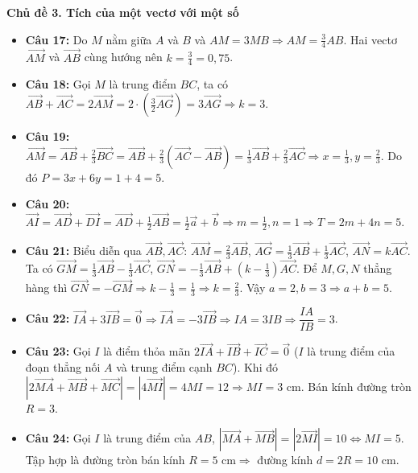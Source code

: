\documentclass[12pt,a4paper]{article}
\begin{document}
\noindent\textbf{\large Chủ đề 3. Tích của một vectơ với một số}
\begin{itemize}[leftmargin=1.5em, itemsep=2.5pt]
    \item \textbf{Câu 17:} Do $M$ nằm giữa $A$ và $B$ và $AM = 3MB \Rightarrow AM = \frac{3}{4}AB$. Hai vectơ $\vec{AM}$ và $\vec{AB}$ cùng hướng nên $k = \frac{3}{4} = 0{,}75$.
    \item \textbf{Câu 18:} Gọi $M$ là trung điểm $BC$, ta có $\vec{AB} + \vec{AC} = 2\vec{AM} = 2 \cdot \left(\frac{3}{2}\vec{AG}\right) = 3\vec{AG} \Rightarrow k = 3$.
    \item \textbf{Câu 19:} $\vec{AM} = \vec{AB} + \frac{2}{3}\vec{BC} = \vec{AB} + \frac{2}{3}(\vec{AC} - \vec{AB}) = \frac{1}{3}\vec{AB} + \frac{2}{3}\vec{AC} \Rightarrow x = \frac{1}{3}, y = \frac{2}{3}$. Do đó $P = 3x + 6y = 1 + 4 = 5$.
    \item \textbf{Câu 20:} $\vec{AI} = \vec{AD} + \vec{DI} = \vec{AD} + \frac{1}{2}\vec{AB} = \frac{1}{2}\vec{a} + \vec{b} \Rightarrow m = \frac{1}{2}, n = 1 \Rightarrow T = 2m + 4n = 5$.
    \item \textbf{Câu 21:} Biểu diễn qua $\vec{AB}, \vec{AC}$: $\vec{AM} = \frac{2}{3}\vec{AB}$, $\vec{AG} = \frac{1}{3}\vec{AB} + \frac{1}{3}\vec{AC}$, $\vec{AN} = k \vec{AC}$. Ta có $\vec{GM} = \frac{1}{3}\vec{AB} - \frac{1}{3}\vec{AC}$, $\vec{GN} = -\frac{1}{3}\vec{AB} + \left(k - \frac{1}{3}\right)\vec{AC}$. Để $M, G, N$ thẳng hàng thì $\vec{GN} = -\vec{GM} \Rightarrow k - \frac{1}{3} = \frac{1}{3} \Rightarrow k = \frac{2}{3}$. Vậy $a = 2, b = 3 \Rightarrow a + b = 5$.
    \item \textbf{Câu 22:} $\vec{IA} + 3\vec{IB} = \vec{0} \Rightarrow \vec{IA} = -3\vec{IB} \Rightarrow IA = 3IB \Rightarrow \dfrac{IA}{IB} = 3$.
    \item \textbf{Câu 23:} Gọi $I$ là điểm thỏa mãn $2\vec{IA} + \vec{IB} + \vec{IC} = \vec{0}$ ($I$ là trung điểm của đoạn thẳng nối $A$ và trung điểm cạnh $BC$). Khi đó $|2\vec{MA} + \vec{MB} + \vec{MC}| = |4\vec{MI}| = 4MI = 12 \Rightarrow MI = 3\text{ cm}$. Bán kính đường tròn $R = 3$.
    \item \textbf{Câu 24:} Gọi $I$ là trung điểm của $AB$, $|\vec{MA} + \vec{MB}| = |2\vec{MI}| = 10 \Leftrightarrow MI = 5$. Tập hợp là đường tròn bán kính $R = 5\text{ cm} \Rightarrow$ đường kính $d = 2R = 10\text{ cm}$.

\end{itemize}
\end{document}
